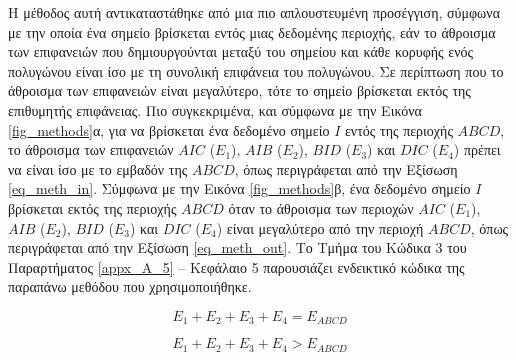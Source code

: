 \documentclass[12pt, a4paper]{report} %
\newcommand{\english}{\foreignlanguage{english}}
\begin{document}
Η μέθοδος αυτή αντικαταστάθηκε από μια πιο απλουστευμένη προσέγγιση, σύμφωνα με την οποία ένα σημείο βρίσκεται εντός μιας 
δεδομένης περιοχής, εάν το άθροισμα των επιφανειών που δημιουργούνται μεταξύ του σημείου και κάθε κορυφής ενός πολυγώνου είναι 
ίσο με τη συνολική επιφάνεια του πολυγώνου. Σε περίπτωση που το άθροισμα των επιφανειών είναι μεγαλύτερο, τότε το σημείο βρίσκεται 
εκτός της επιθυμητής επιφάνειας. Πιο συγκεκριμένα, και σύμφωνα με την Εικόνα \ref{fig_methods}α, για να βρίσκεται ένα δεδομένο 
σημείο \english{$I$} εντός της περιοχής \english{$ABCD$}, το άθροισμα των επιφανειών \english{$AIC$} (\english{$E_1$}), 
\english{$AIB$} (\english{$E_2$}), \english{$BID$} (\english{$E_3$}) και \english{$DIC$} (\english{$E_4$}) πρέπει να είναι ίσο 
με το εμβαδόν της \english{$ABCD$}, όπως περιγράφεται από την Εξίσωση \ref{eq_meth_in}. Σύμφωνα με την Εικόνα \ref{fig_methods}β, 
ένα δεδομένο σημείο \english{$I$} βρίσκεται εκτός της περιοχής \english{$ABCD$} όταν το άθροισμα των περιοχών \english{$AIC$} 
(\english{$E_1$}), \english{$AIB$} (\english{$E_2$}), \english{$BID$} (\english{$E_3$}) και \english{$DIC$} (\english{$E_4$}) είναι 
μεγαλύτερο από την περιοχή \english{$ABCD$}, όπως περιγράφεται από την Eξίσωση \ref{eq_meth_out}. Το Τμήμα του Κώδικα 3 του 
Παραρτήματος \ref{appx_A_5} – Κεφάλαιο 5 παρουσιάζει ενδεικτικό κώδικα της παραπάνω μεθόδου που χρησιμοποιήθηκε.

\begin{equation}
    E_1 + E_2 + E_3 + E_4 = E_{ABCD}
    \label{eq_meth_in}
\end{equation}

\begin{equation}
    E_1 + E_2 + E_3 + E_4 > E_{ABCD}
    \label{eq_meth_out}
\end{equation}
\end{document}
